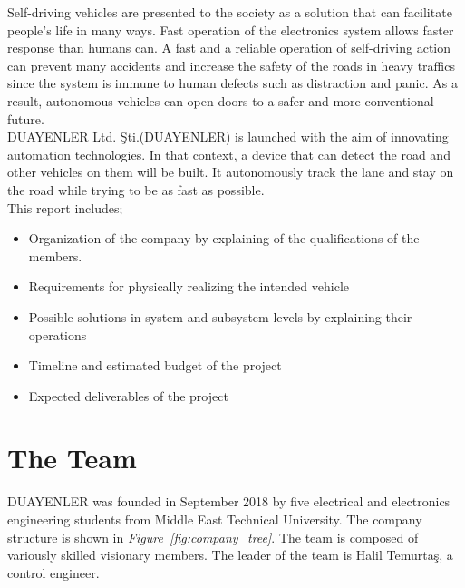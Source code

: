 \documentclass[a4paper,12pt]{article}
\begin{document}
Self-driving vehicles are presented to the society as a solution that can facilitate people's life in many ways. Fast operation of the electronics system allows faster response than humans can. A fast and a reliable operation of self-driving action can prevent many accidents and increase the safety of the roads in heavy traffics since the system is immune to human defects such as distraction and panic. As a result, autonomous vehicles can open doors to a safer and more conventional future.\\

DUAYENLER Ltd. Şti.(DUAYENLER) is launched with the aim of innovating automation technologies. In that context, a device that can detect the road and other vehicles on them will be built. It autonomously track the lane and stay on the road while trying to be as fast as possible.\\

This report includes;
\begin{itemize}
	\item Organization of the company by explaining of the qualifications of the members. \vspace{-.2cm}
	\item Requirements for physically realizing the intended vehicle \vspace{-.2cm}
	\item Possible solutions in system and subsystem levels by explaining their operations\vspace{-.2cm}
	\item Timeline and estimated budget of the project\vspace{-.2cm}
	\item Expected deliverables of the project \vspace{-.2cm}
\end{itemize} 



\section{The Team}

	DUAYENLER was founded in September 2018 by five electrical and electronics engineering students from Middle East Technical University. The company structure is shown in \textit{Figure~\ref{fig:company_tree}}. The team is composed of variously skilled visionary members. The leader of the team is Halil Temurtaş, a control engineer.\\
	
\end{document}
